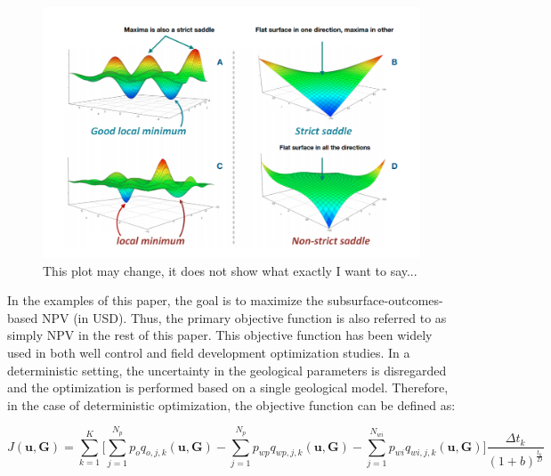 \documentclass[]{elsarticle} %
\begin{document}
\begin{figure}

{\centering \includegraphics[width=0.7\linewidth]{img/globalopt} 

}

\caption{This plot may change, it does not show what exactly I want to say...}\label{fig:optglobal}
\end{figure}

In the examples of this paper, the goal is to maximize the subsurface-outcomes-based NPV (in USD). Thus, the primary objective function is also referred to as simply NPV in the rest of this paper. This objective function has been widely used in both well control and field development optimization studies. In a deterministic setting, the uncertainty in the geological parameters is disregarded and the optimization is performed based on a single geological model. Therefore, in the case of deterministic optimization, the objective function can be defined as:

\begin{equation}
J(\mathbf{u, G})= \sum_{k=1}^{K} \Bigg [\sum_{j=1}^{N_p}p_oq_{o,j,k}(\mathbf{u, G}) 
- \sum_{j=1}^{N_p}p_{wp}q_{wp,j,k}(\mathbf{u, G}) - 
\sum_{j=1}^{N_{wi}}p_{wi}q_{wi,j,k}(\mathbf{u, G}) \Bigg]\frac{\Delta t_k}{(1+b)^{\frac{t_k}{D}}}
\label{eq:npvdet}
\end{equation}
\end{document}
